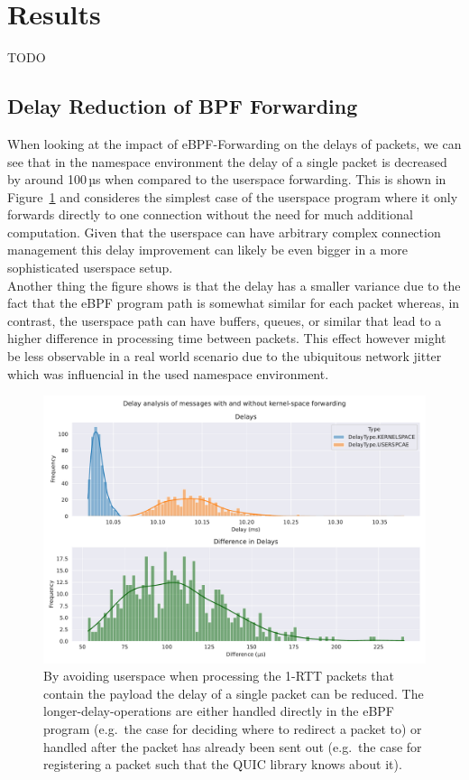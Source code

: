 \section{Results}\label{sec:results}
TODO 

\subsection{Delay Reduction of BPF Forwarding}
When looking at the impact of eBPF-Forwarding on the delays of packets, we can see that
in the namespace environment the delay of a single packet is decreased by around 100\,µs
when compared to the userspace forwarding. This is shown in Figure~\ref{fig:delay-improvement} and 
consideres the simplest case of the userspace program where it only forwards directly to one connection
without the need for much additional computation. Given that the userspace can have arbitrary complex 
connection management this delay improvement can likely be even bigger in a more sophisticated userspace
setup.
\\
Another thing the figure shows is that the delay has a smaller variance due to the fact that the eBPF program
path is somewhat similar for each packet whereas, in contrast, the userspace path can have buffers, queues, 
or similar that lead to a higher difference in processing time between packets. 
This effect however might be less observable in a real world scenario due to the ubiquitous network jitter which 
was influencial in the used namespace environment.
\begin{figure}[htbp]
    \centering
    \includegraphics[width=\textwidth]{figures/04_testing_and_results/delays_small_packets_simple_userspace.pdf}
    \caption[Delay analysis of eBPF approach]{By avoiding userspace when processing the 1-RTT packets that contain the payload
    the delay of a single packet can be reduced. The longer-delay-operations are either handled
    directly in the eBPF program (e.g.~the case for deciding where to redirect a packet to) or 
    handled after the packet has already been sent out (e.g.~the case for registering a packet 
    such that the QUIC library knows about it).}\label{fig:delay-improvement}
\end{figure}

